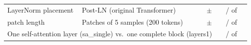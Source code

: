 \begin{tabular}{llrrcrcr}
\addlinespace
LayerNorm placement & Post-LN (original Transformer) & \transformerParamsPostLn{} & \transformerTokensPostLn{} & \transformerValAurocMeanPostLn{} $\pm$ \transformerValAurocSdPostLn{} & \transformerDiffMeanPostLn{} & \transformerNSeedsBetterPostLn{} / \transformerNSeedsWorsePostLn{} of \transformerNSeedsComparedPostLn{} & \transformerOrderDropPostLn{} \\
\addlinespace
patch length & Patches of 5 samples (200 tokens) & \transformerParamsPatchFive{} & \transformerTokensPatchFive{} & \transformerValAurocMeanPatchFive{} $\pm$ \transformerValAurocSdPatchFive{} & \transformerDiffMeanPatchFive{} & \transformerNSeedsBetterPatchFive{} / \transformerNSeedsWorsePatchFive{} of \transformerNSeedsComparedPatchFive{} & \transformerOrderDropPatchFive{} \\
\midrule
\multicolumn{5}{l}{One self-attention layer (sa\_single) vs.\ one complete block (layers1)} & \transformerPairSaVsBlockMean{} & \transformerPairSaVsBlockNBetter{} / \transformerPairSaVsBlockNWorse{} of \transformerPairSaVsBlockNCompared{} & \\
\bottomrule
\end{tabular}
